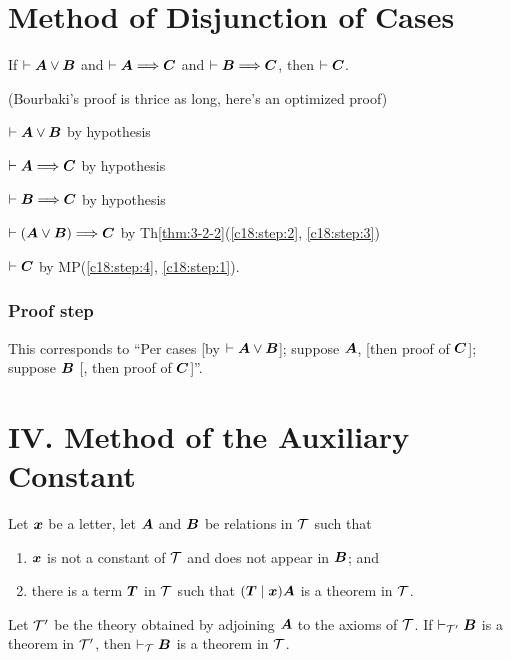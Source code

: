 \section*{Method of Disjunction of Cases}

\begin{dc}\label{c18}
If $\vdash\boldsymbol{A}\lor\boldsymbol{B}$ and
$\vdash\boldsymbol{A}\Longrightarrow\boldsymbol{C}$ and $\vdash\boldsymbol{B}\Longrightarrow\boldsymbol{C}$,
then $\vdash\boldsymbol{C}$.
\end{dc}
(Bourbaki's proof is thrice as long, here's an optimized proof)
\begin{pf}
\item\label{c18:step:1} $\vdash\boldsymbol{A}\lor\boldsymbol{B}$ by hypothesis
\item\label{c18:step:2} $\vdash\boldsymbol{A}\Longrightarrow\boldsymbol{C}$ by hypothesis
\item\label{c18:step:3} $\vdash\boldsymbol{B}\Longrightarrow\boldsymbol{C}$ by hypothesis
\item\label{c18:step:4} $\vdash(\boldsymbol{A}\lor\boldsymbol{B})\Longrightarrow\boldsymbol{C}$
by Th\ref{thm:3-2-2}(\ref{c18:step:2}, \ref{c18:step:3})
\item $\vdash\boldsymbol{C}$ by MP(\ref{c18:step:4}, \ref{c18:step:1}).
\end{pf}

\subsubsection{Proof step}
This corresponds to ``Per cases [by
  $\vdash\boldsymbol{A}\lor\boldsymbol{B}$];
suppose $\boldsymbol{A}$, [then proof of $\boldsymbol{C}$]; suppose
$\boldsymbol{B}$ [, then proof of $\boldsymbol{C}$]''.

\section*{IV. Method of the Auxiliary Constant}

\begin{dc}\label{c19}
Let $\boldsymbol{x}$ be a letter, let $\boldsymbol{A}$ and
$\boldsymbol{B}$ be relations in $\mathcal{T}$ such that
\begin{enumerate}
\item\label{c19:hypo:1} $\boldsymbol{x}$ is not a constant of $\mathcal{T}$ and does not
  appear in $\boldsymbol{B}$; and
\item\label{c19:hypo:2} there is a term $\boldsymbol{T}$ in $\mathcal{T}$ such that $(\boldsymbol{T}\mid\boldsymbol{x})\boldsymbol{A}$
  is a theorem in $\mathcal{T}$.
\end{enumerate}
Let $\mathcal{T}'$ be the theory obtained by adjoining $\boldsymbol{A}$
to the axioms of $\mathcal{T}$. If $\vdash_{\mathcal{T}'}\boldsymbol{B}$
is a theorem in $\mathcal{T}'$, then
$\vdash_{\mathcal{T}}\boldsymbol{B}$ is a theorem in $\mathcal{T}$.
\end{dc}

